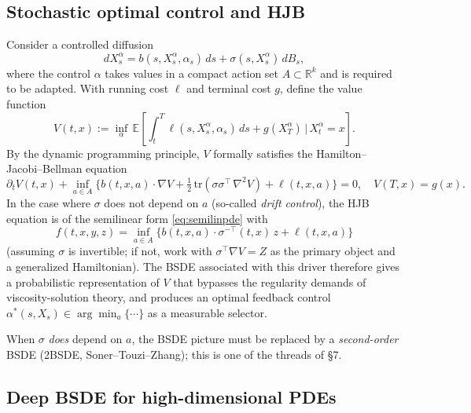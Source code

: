 \documentclass{article}
\newcommand{\E}{\mathbb{E}}
\newcommand{\R}{\mathbb{R}}
\begin{document}
\subsection{Stochastic optimal control and HJB}

Consider a controlled diffusion
\[
  dX^\alpha_s = b(s, X^\alpha_s, \alpha_s)\, ds + \sigma(s, X^\alpha_s)\, dB_s,
\]
where the control $\alpha$ takes values in a compact action set $A \subset \R^k$ and is required to be adapted. With running cost $\ell$ and terminal cost $g$, define the value function
\[
  V(t, x) := \inf_{\alpha}\, \E\!\left[ \int_t^T \ell(s, X^\alpha_s, \alpha_s)\,ds + g(X^\alpha_T) \,\bigg|\, X^\alpha_t = x \right].
\]
By the dynamic programming principle, $V$ formally satisfies the Hamilton--Jacobi--Bellman equation
\[
  \partial_t V(t, x) + \inf_{a \in A}\Big\{ b(t, x, a) \cdot \nabla V + \tfrac12\, \mathrm{tr}(\sigma \sigma^{\top}\, \nabla^2 V) + \ell(t, x, a) \Big\} = 0, \quad V(T, x) = g(x).
\]
In the case where $\sigma$ does not depend on $a$ (so-called \emph{drift control}), the HJB equation is of the semilinear form \eqref{eq:semilinpde} with
\[
  f(t, x, y, z) = \inf_{a \in A}\!\Big\{ b(t, x, a) \cdot \sigma^{-\top}(t, x)\, z + \ell(t, x, a) \Big\}
\]
(assuming $\sigma$ is invertible; if not, work with $\sigma^{\top} \nabla V = Z$ as the primary object and a generalized Hamiltonian). The BSDE associated with this driver therefore gives a probabilistic representation of $V$ that bypasses the regularity demands of viscosity-solution theory, and produces an optimal feedback control $\alpha^*(s, X_s) \in \arg\min_a \{\cdots\}$ as a measurable selector.

When $\sigma$ \emph{does} depend on $a$, the BSDE picture must be replaced by a \emph{second-order} BSDE (2BSDE, Soner--Touzi--Zhang); this is one of the threads of \S7.

\subsection{Deep BSDE for high-dimensional PDEs}
\end{document}
